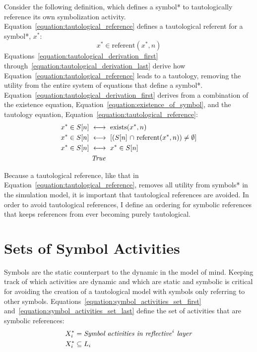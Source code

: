 Consider the following definition, which defines a symbol* to
tautologically reference its own symbolization activity.
Equation~\ref{equation:tautological_reference} defines a tautological
referent for a symbol*, $x^*$:
\begin{equation}
\label{equation:tautological_reference}
x^* \in \text{referent}(x^*, n)
\end{equation}
Equations~\ref{equation:tautological_derivation_first}
through~\ref{equation:tautological_derivation_last} derive how
Equation~\ref{equation:tautological_reference} leads to a tautology,
removing the utility from the entire system of equations that define a
symbol*.  Equation~\ref{equation:tautological_derivation_first}
derives from a combination of the existence equation,
Equation~\ref{equation:existence_of_symbol}, and the tautology
equation, Equation~\ref{equation:tautological_reference}:
\begin{align}
\label{equation:tautological_derivation_first}
                                          x^* \in S[n] ~&\longleftrightarrow~ \text{exists}(x^*, n) \\
                                          x^* \in S[n] ~&\longleftrightarrow~ [(S[n] ~{\cap}~ \text{referent}(x^*, n)) \neq \emptyset] \\
                                          x^* \in S[n] ~&\longleftrightarrow~ x^* \in S[n] \\
\label{equation:tautological_derivation_last}
                                                       ~&\text{\emph{True}}
\end{align}

Because a tautological reference, like that in
Equation~\ref{equation:tautological_reference}, removes all utility
from symbols* in the simulation model, it is important that
tautological references are avoided.  In order to avoid tautological
references, I define an ordering for symbolic references that keeps
references from ever becoming purely tautological.

\section{Sets of Symbol Activities}

Symbols are the static counterpart to the dynamic in the model of
mind.  Keeping track of which activities are dynamic and which are
static and symbolic is critical for avoiding the creation of a
tautological model with symbols only referring to other symbols.
Equations~\ref{equation:symbol_activities_set_first}
and~\ref{equation:symbol_activities_set_last} define the set of
activities that are symbolic references:
\begin{align}
\label{equation:symbol_activities_set_first}
X^*_i &= \text{\emph{Symbol activities in reflective}}^i\text{\emph{ layer}} \\
\label{equation:symbol_activities_set_last}
X^*_i &\subseteq L_i
\end{align}

